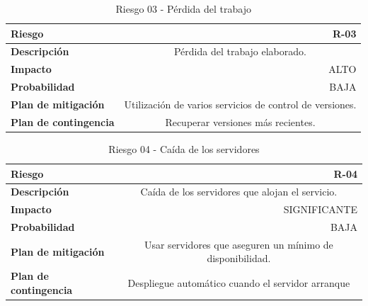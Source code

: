         \begin{table}[H]
        \centering
        \begin{tabular}{|l|c}
        \hline
        \textbf{Riesgo}               & \multicolumn{1}{r|}{R-03}                                             \\ \hline
        \textbf{Descripción}          & \multicolumn{1}{X|}{Pérdida del trabajo elaborado.}
        \\ \hline
        \textbf{Impacto}              & \multicolumn{1}{r|}{ALTO}                                             \\ \hline
        \textbf{Probabilidad}         & \multicolumn{1}{r|}{BAJA}                                         \\ \hline
        \textbf{Plan de mitigación}   & \multicolumn{1}{X|}{Utilización de varios servicios de control de versiones. }
        \\ \hline
        \textbf{Plan de contingencia} & \multicolumn{1}{X|}{Recuperar versiones más recientes.}
        \\ \hline
        \end{tabular}
        \caption{Riesgo 03 - Pérdida del trabajo}
        \label{table:riskperdida}
        \end{table}
        \begin{table}[H]
        \centering
        \begin{tabular}{|l|c}
        \hline
        \textbf{Riesgo}               & \multicolumn{1}{r|}{R-04}                                             \\ \hline
        \textbf{Descripción}          & \multicolumn{1}{X|}{Caída de los servidores que alojan el servicio.}
        \\ \hline
        \textbf{Impacto}              & \multicolumn{1}{r|}{SIGNIFICANTE}
        \\ \hline
        \textbf{Probabilidad}         & \multicolumn{1}{r|}{BAJA}                                         \\ \hline
        \textbf{Plan de mitigación}   & \multicolumn{1}{X|}{ Usar servidores que aseguren un mínimo de disponibilidad. }
        \\ \hline
        \textbf{Plan de contingencia} & \multicolumn{1}{X|}{ Despliegue automático cuando el servidor arranque }
        \\ \hline
        \end{tabular}
        \caption{Riesgo 04 - Caída de los servidores}
        \label{table:riskperdida}
        \end{table}
